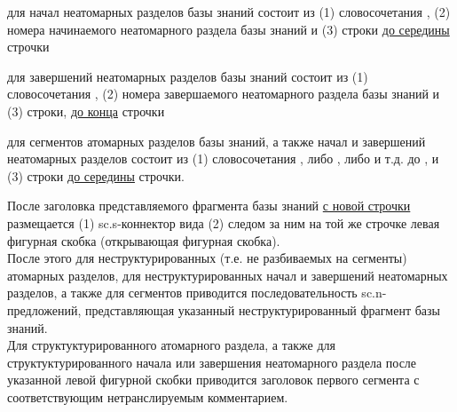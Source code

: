 \begin{SCn}
{\begin{scnitemize}
    \item для начал неатомарных разделов базы знаний состоит из (1) словосочетания , (2) номера начинаемого неатомарного раздела базы знаний и (3) строки  \uline{до середины} строчки
    \item для завершений неатомарных разделов базы знаний состоит из (1) словосочетания , (2) номера завершаемого неатомарного раздела базы знаний и (3) строки,  \uline{до конца} строчки
    \item для сегментов атомарных разделов базы знаний, а также начал и завершений неатомарных разделов состоит из (1) словосочетания , либо , либо  и т.д. до , и (3) строки  \uline{до середины} строчки.
\end{scnitemize}
После заголовка представляемого фрагмента базы знаний \uline{с новой строчки} размещается (1) sc.s-коннектор вида \scnqqi{$\supset$=} (2) следом за ним на той же строчке левая фигурная скобка (открывающая фигурная скобка).\\
После этого для неструктурированных (т.е. не разбиваемых на сегменты) атомарных разделов, для неструктурированных начал и завершений неатомарных разделов, а также для сегментов приводится последовательность sc.n-предложений, представляющая указанный неструктурированный фрагмент базы знаний.\\
Для структуктурированного атомарного раздела, а также для структуктурированного начала или завершения неатомарного раздела после указанной левой фигурной скобки приводится заголовок первого сегмента с соответствующим нетранслируемым комментарием.\\
}
\end{SCn}
